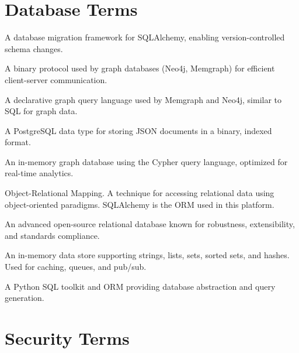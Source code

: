 \section{Database Terms}
\label{app:glossary:database}

\begin{description}[style=nextline,leftmargin=2cm,labelwidth=1.8cm]

\item[Alembic]
A database migration framework for SQLAlchemy, enabling version-controlled schema changes.

\item[Bolt Protocol]
A binary protocol used by graph databases (Neo4j, Memgraph) for efficient client-server communication.

\item[Cypher]
A declarative graph query language used by Memgraph and Neo4j, similar to SQL for graph data.

\item[JSONB]
A PostgreSQL data type for storing JSON documents in a binary, indexed format.

\item[Memgraph]
An in-memory graph database using the Cypher query language, optimized for real-time analytics.

\item[ORM]
Object-Relational Mapping. A technique for accessing relational data using object-oriented paradigms. SQLAlchemy is the ORM used in this platform.

\item[PostgreSQL]
An advanced open-source relational database known for robustness, extensibility, and standards compliance.

\item[Redis]
An in-memory data store supporting strings, lists, sets, sorted sets, and hashes. Used for caching, queues, and pub/sub.

\item[SQLAlchemy]
A Python SQL toolkit and ORM providing database abstraction and query generation.

\end{description}

\section{Security Terms}
\label{app:glossary:security}

